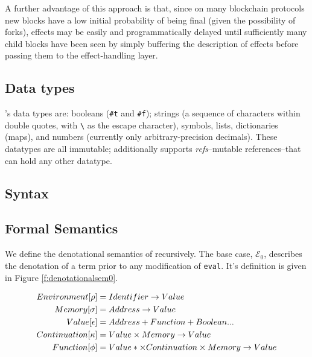 A further advantage of this approach is that, since on many blockchain
protocols new blocks have a low initial probability of being final (given the
possibility of forks), effects may be easily and programmatically delayed until
sufficiently many child blocks have been seen by simply buffering the
description of effects before passing them to the effect-handling layer.

\subsection{Data types} \rad's data types are: booleans (\texttt{\#t} and
\texttt{\#f}); strings (a sequence of characters within double quotes, with
\texttt{\textbackslash} as the escape character), symbols, lists, dictionaries
(maps), and numbers (currently only arbitrary-precision decimals). These
datatypes are all immutable; additionally \rad supports \textit{refs}--mutable
references--that can hold any other datatype.

\subsection{Syntax}


\subsection{Formal Semantics} We define the denotational semantics of \rad
recursively. The base case, $\mathcal{E}_{0}$, describes the denotation of a
term prior to any modification of \texttt{eval}. It's definition is given in
Figure \ref{f:denotationalsem0}.

\begin{figure}[H]
\begin{align*}
    Environment [\rho] &= Identifier \rightarrow Value \\
    Memory [\sigma] &= Address \rightarrow Value \\
    Value [\epsilon] &= Address + Function + Boolean ... \\
    Continuation [\kappa] &= Value \times Memory \rightarrow Value \\
    Function [\phi] &= Value* \times Continuation \times Memory \rightarrow Value
\end{align*}
\label{f:denotationalsemleged}
\end{figure}


